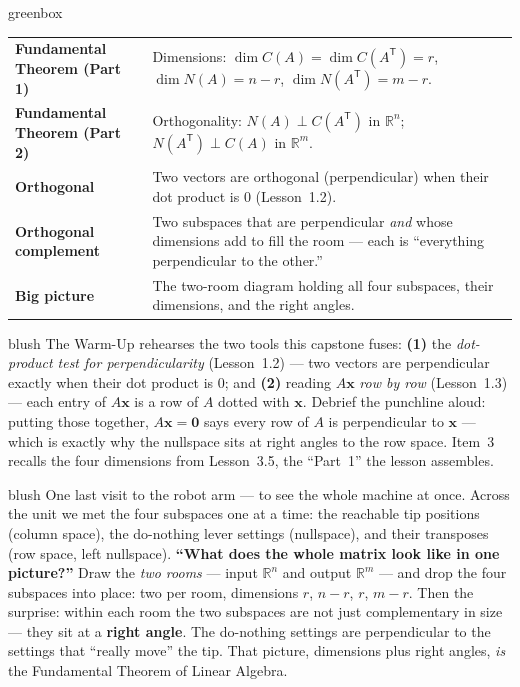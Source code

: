 \documentclass[10pt]{article}
\newcommand{\xx}{\mathbf{x}}
\newcommand{\zero}{\mathbf{0}}
\newcommand{\T}{\mathsf{T}}
\begin{document}
\begin{skillbox}{greenbox}
\renewcommand{\arraystretch}{1.3}
\begin{tabularx}{\linewidth}{@{}l X@{}}
\textbf{Fundamental Theorem (Part 1)} & Dimensions: $\dim C(A)=\dim C(A^{\T})=r$, $\dim N(A)=n-r$, $\dim N(A^{\T})=m-r$. \\
\textbf{Fundamental Theorem (Part 2)} & Orthogonality: $N(A)\perp C(A^{\T})$ in $\mathbb{R}^n$; $N(A^{\T})\perp C(A)$ in $\mathbb{R}^m$. \\
\textbf{Orthogonal} & Two vectors are orthogonal (perpendicular) when their dot product is $0$ (Lesson~1.2). \\
\textbf{Orthogonal complement} & Two subspaces that are perpendicular \emph{and} whose dimensions add to fill the room --- each is ``everything perpendicular to the other.'' \\
\textbf{Big picture} & The two-room diagram holding all four subspaces, their dimensions, and the right angles. \\
\end{tabularx}
\end{skillbox}

\begin{fixedskillbox}{blush}
    The Warm-Up rehearses the two tools this capstone fuses: \textbf{(1)} the \emph{dot-product test for
    perpendicularity} (Lesson~1.2) --- two vectors are perpendicular exactly when their dot product is $0$;
    and \textbf{(2)} reading $A\xx$ \emph{row by row} (Lesson~1.3) --- each entry of $A\xx$ is a row of $A$
    dotted with $\xx$. Debrief the punchline aloud: putting those together, $A\xx=\zero$ says every row of
    $A$ is perpendicular to $\xx$ --- which is exactly why the nullspace sits at right angles to the row
    space. Item~3 recalls the four dimensions from Lesson~3.5, the ``Part~1'' the lesson assembles.
\end{fixedskillbox}

\begin{skillbox}[Hook]{blush}
    One last visit to the robot arm --- to see the whole machine at once. Across the unit we met the four
    subspaces one at a time: the reachable tip positions (column space), the do-nothing lever settings
    (nullspace), and their transposes (row space, left nullspace). \textbf{``What does the whole matrix look
    like in one picture?''} Draw the \emph{two rooms} --- input $\mathbb{R}^n$ and output $\mathbb{R}^m$ ---
    and drop the four subspaces into place: two per room, dimensions $r$, $n-r$, $r$, $m-r$. Then the
    surprise: within each room the two subspaces are not just complementary in size --- they sit at a
    \textbf{right angle}. The do-nothing settings are perpendicular to the settings that ``really move'' the
    tip. That picture, dimensions plus right angles, \emph{is} the Fundamental Theorem of Linear Algebra.
\end{skillbox}
\end{document}
